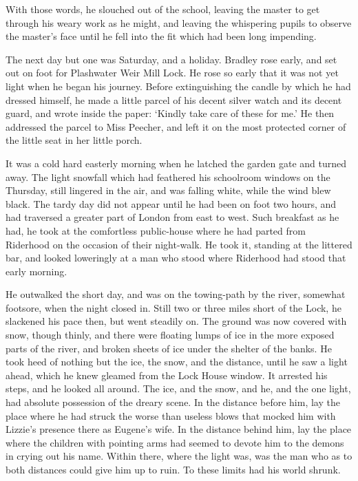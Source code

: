With those words, he slouched out of the school, leaving the master
to get through his weary work as he might, and leaving the whispering
pupils to observe the master’s face until he fell into the fit which had
been long impending.

The next day but one was Saturday, and a holiday. Bradley rose early,
and set out on foot for Plashwater Weir Mill Lock. He rose so early that
it was not yet light when he began his journey. Before extinguishing the
candle by which he had dressed himself, he made a little parcel of his
decent silver watch and its decent guard, and wrote inside the paper:
‘Kindly take care of these for me.’ He then addressed the parcel to Miss
Peecher, and left it on the most protected corner of the little seat in
her little porch.

It was a cold hard easterly morning when he latched the garden gate
and turned away. The light snowfall which had feathered his schoolroom
windows on the Thursday, still lingered in the air, and was falling
white, while the wind blew black. The tardy day did not appear until he
had been on foot two hours, and had traversed a greater part of London
from east to west. Such breakfast as he had, he took at the comfortless
public-house where he had parted from Riderhood on the occasion of
their night-walk. He took it, standing at the littered bar, and looked
loweringly at a man who stood where Riderhood had stood that early
morning.

He outwalked the short day, and was on the towing-path by the river,
somewhat footsore, when the night closed in. Still two or three miles
short of the Lock, he slackened his pace then, but went steadily on. The
ground was now covered with snow, though thinly, and there were floating
lumps of ice in the more exposed parts of the river, and broken sheets
of ice under the shelter of the banks. He took heed of nothing but the
ice, the snow, and the distance, until he saw a light ahead, which he
knew gleamed from the Lock House window. It arrested his steps, and he
looked all around. The ice, and the snow, and he, and the one light, had
absolute possession of the dreary scene. In the distance before him, lay
the place where he had struck the worse than useless blows that mocked
him with Lizzie’s presence there as Eugene’s wife. In the distance
behind him, lay the place where the children with pointing arms had
seemed to devote him to the demons in crying out his name. Within there,
where the light was, was the man who as to both distances could give him
up to ruin. To these limits had his world shrunk.

